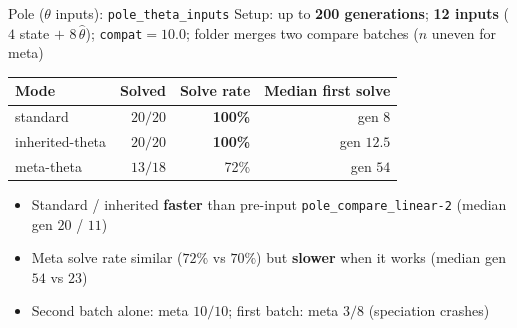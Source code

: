 \documentclass[aspectratio=169,11pt]{beamer}
\begin{document}
\begin{frame}{Pole ($\theta$ inputs): \texttt{pole\_theta\_inputs}}
  Setup: up to \textbf{200 generations}; \textbf{12 inputs} ($4$ state $+$ $8\,\hat\theta$);
  \texttt{compat}${}=10.0$; folder merges two compare batches ($n$ uneven for meta)

  \vspace{0.6em}
  \begin{tabular}{lrrr}
    \toprule
    Mode & Solved & Solve rate & Median first solve \\
    \midrule
    standard & $20/20$ & \textbf{100\%} & gen $8$ \\
    inherited-theta & $20/20$ & \textbf{100\%} & gen $12.5$ \\
    meta-theta & $13/18$ & 72\% & gen $54$ \\
    \bottomrule
  \end{tabular}

  \vspace{0.6em}
  \begin{itemize}
    \item Standard / inherited \textbf{faster} than pre-input \texttt{pole\_compare\_linear-2}
      (median gen $20$ / $11$)
    \item Meta solve rate similar ($72\%$ vs $70\%$) but \textbf{slower} when it works
      (median gen $54$ vs $23$)
    \item Second batch alone: meta $10/10$; first batch: meta $3/8$ (speciation crashes)
  \end{itemize}
\end{frame}
\end{document}
